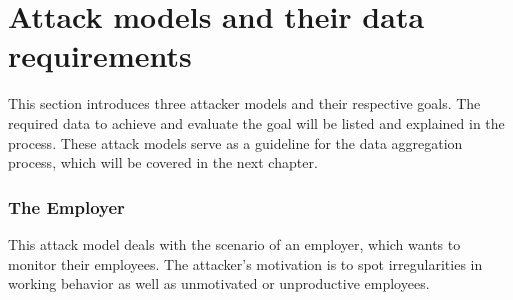 \chapter{Attack models and their data requirements}\label{attack-models}
This section introduces three attacker models and their respective goals.
The required data to achieve and evaluate the goal will be listed and explained in the process.
These attack models serve as a guideline for the data aggregation process, which will be covered in the next chapter.

\subsection{The Employer}\label{employer-monitoring}
This attack model deals with the scenario of an employer, which wants to monitor their employees.
The attacker's motivation is to spot irregularities in working behavior as well as unmotivated or unproductive employees.

